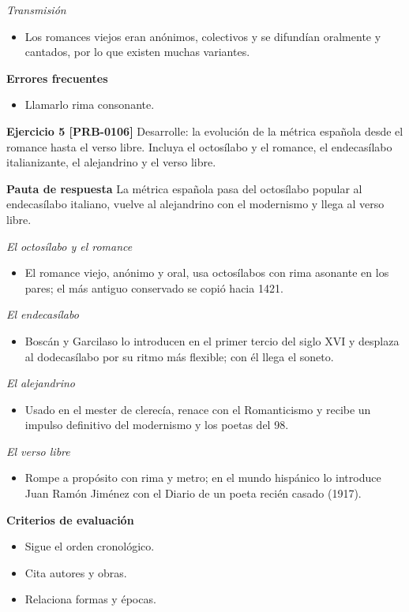 \documentclass{book}
\begin{document}
\noindent\textit{Transmisión}
\begin{itemize}
\item Los romances viejos eran anónimos, colectivos y se difundían oralmente y cantados, por lo que existen muchas variantes.
\end{itemize}

\noindent\textbf{Errores frecuentes}
\begin{itemize}
\item Llamarlo rima consonante.
\end{itemize}

\noindent\textbf{Ejercicio 5 [PRB-0106]}
Desarrolle: la evolución de la métrica española desde el romance hasta el verso libre. Incluya el octosílabo y el romance, el endecasílabo italianizante, el alejandrino y el verso libre.


\noindent\textbf{Pauta de respuesta}
La métrica española pasa del octosílabo popular al endecasílabo italiano, vuelve al alejandrino con el modernismo y llega al verso libre.


\noindent\textit{El octosílabo y el romance}
\begin{itemize}
\item El romance viejo, anónimo y oral, usa octosílabos con rima asonante en los pares; el más antiguo conservado se copió hacia 1421.
\end{itemize}

\noindent\textit{El endecasílabo}
\begin{itemize}
\item Boscán y Garcilaso lo introducen en el primer tercio del siglo XVI y desplaza al dodecasílabo por su ritmo más flexible; con él llega el soneto.
\end{itemize}

\noindent\textit{El alejandrino}
\begin{itemize}
\item Usado en el mester de clerecía, renace con el Romanticismo y recibe un impulso definitivo del modernismo y los poetas del 98.
\end{itemize}

\noindent\textit{El verso libre}
\begin{itemize}
\item Rompe a propósito con rima y metro; en el mundo hispánico lo introduce Juan Ramón Jiménez con el Diario de un poeta recién casado (1917).
\end{itemize}

\noindent\textbf{Criterios de evaluación}
\begin{itemize}
\item Sigue el orden cronológico.
\item Cita autores y obras.
\item Relaciona formas y épocas.
\end{itemize}
\end{document}
